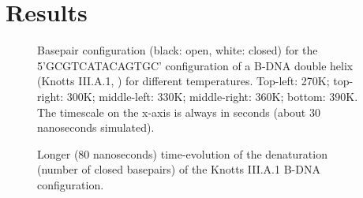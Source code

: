\section{Results}
\begin{figure}[h] \begin{minipage}{7cm}
 \end{minipage} \begin{minipage}{7cm}  \end{minipage}
\begin{minipage}{7cm}
 \end{minipage} \begin{minipage}{7cm}\end{minipage}\begin{center}

\caption{Basepair configuration (black: open, white: closed) for the 5'\-GCGTCATACAGTGC' configuration of a B-DNA double helix (Knotts III.A.1, \cite{knotts2007coarse}) for different temperatures. Top-left: 270K; top-right: 300K; middle-left: 330K; middle-right: 360K; bottom: 390K. The timescale on the x-axis is always in seconds (about 30 nanoseconds simulated).}\end{center}
\end{figure}



\begin{figure}\begin{center}

\caption{Longer (80 nanoseconds) time-evolution of the denaturation (number of closed basepairs) of the Knotts III.A.1 B-DNA configuration.}\end{center}\end{figure}
